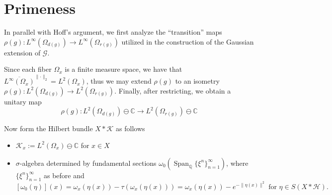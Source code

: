 \documentclass[a4paper,11pt]{article}
\numberwithin{equation}{section}
\newtheorem{thm}{Theorem}[section]
\theoremstyle{definition}
\theoremstyle{remark}
\newtheorem{rem}[thm]{Remark}
\numberwithin{equation}{section}
\newcommand{\rG}{\mathcal{G}}
\newcommand{\C}{\mathbb{C}}
\newcommand{\Q}{\mathbb{Q}}
\def\H{\mathcal H}
\def\K{\mathcal K}
\DeclareMathOperator{\Span}{Span}
\providecommand{\norm}[1]{\lVert#1\rVert}
\newcommand*\cls[1]{\overline{#1}}
\numberwithin{equation}{section}
\begin{document}
\section{Primeness}

%
%



In parallel with Hoff's argument, we first analyze the ``transition'' maps $ \rho(g):L^{\infty}(\Omega_{d(g)}) \to L^{\infty}(\Omega_{r(g)}) $ utilized in the construction of the Gaussian extension of $ \rG $.

Since each fiber $ \Omega_{x} $ is a finite measure space, we have that $ \cls{L^{\infty}(\Omega_{x})}^{\norm{\cdot}_{2}} = L^{2}(\Omega_{x}) $, thus we may extend $ \rho(g) $ to an isometry $ \rho(g):L^{2}(\Omega_{d(g)})\to L^{2}(\Omega_{r(g)}) $. Finally, after restricting, we obtain a unitary map
$$
  \rho(g): L^{2}(\Omega_{d(g)})\ominus \C \to L^{2}(\Omega_{r(g)})\ominus \C
$$

Now form the Hilbert bundle $ X\ast \K $ as follows
\begin{itemize}
  \item $ \K_{x}:=L^{2}(\Omega_{x})\ominus \C $ for $ x\in X $
  \item $ \sigma $-algebra determined by fundamental sections $ \omega_{0}(\Span_{\Q}\{\xi^{n}\}_{n=1}^{\infty}) $, where $ \{\xi^{n}\}_{n=1}^{\infty} $ as before and 
    $$
    [\omega_{0}(\eta)](x) = \omega_{x}(\eta(x)) - \tau(\omega_{x}(\eta(x))) = \omega_{x}(\eta(x)) - e^{-\norm{\eta(x)}^{2}} \text{ for }\eta\in S(X\ast\H).
    $$
\end{itemize}
\end{document}
